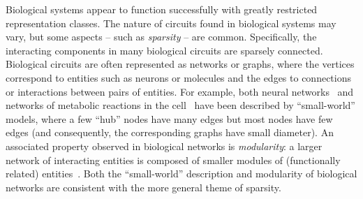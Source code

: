 \documentclass[11pt]{article}
\begin{document}
Biological systems appear to function successfully with greatly restricted
representation classes. The nature of circuits found in biological systems may
vary, but some aspects -- such as \emph{sparsity} -- are common.  Specifically,
the interacting components in many biological circuits are sparsely connected.
Biological circuits are often represented as networks or graphs, where the
vertices correspond to entities such as neurons or molecules and the edges to
connections or interactions between pairs of entities. For example, both neural
networks~\cite{Watts:1998} and networks of metabolic reactions in the
cell~\cite{Wagner:2001,Barabasi:2000} have been described by ``small-world''
models, where a few ``hub'' nodes have many edges but most nodes have few edges
(and consequently, the corresponding graphs have small diameter).  An associated
property observed in biological networks is \emph{modularity}: a larger network
of interacting entities is composed of smaller modules of (functionally related)
entities~\cite{Hartwell:1999}.  Both the ``small-world'' description and
modularity of biological networks are consistent with the more general theme of
sparsity.
\end{document}
